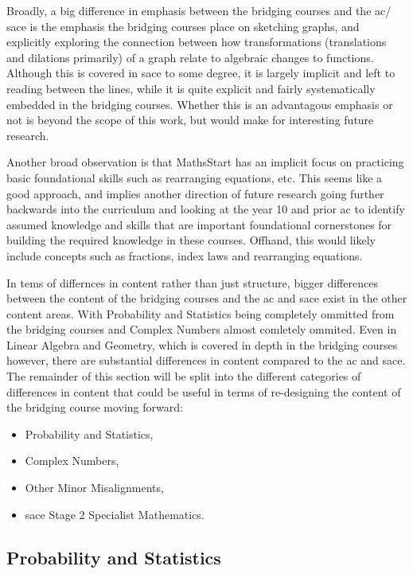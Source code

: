 \documentclass[twoside,12pt,a4paper]{report}
\begin{document}
Broadly, a big difference in emphasis between the bridging courses and the \gls{ac}/ \gls{sace} is the emphasis the bridging courses place on sketching graphs, and explicitly exploring the connection between how transformations (translations and dilations primarily) of a graph relate to algebraic changes to functions. Although this is covered in \gls{sace} to some degree, it is largely implicit and left to reading between the lines, while it is quite explicit and fairly systematically embedded in the bridging courses. Whether this is an advantagous emphasis or not is beyond the scope of this work, but would make for interesting future research.

Another broad observation is that MathsStart has an implicit focus on practicing basic foundational skills such as rearranging equations, etc. This seems like a good approach, and implies another direction of future research going further backwards into the curriculum and looking at the year 10 and prior \gls{ac} to identify assumed knowledge and skills that are important foundational cornerstones for building the required knowledge in these courses. Offhand, this would likely include concepts such as fractions, index laws and rearranging equations. 

In tems of differnces in content rather than just structure, bigger differences between the content of the bridging courses and the \gls{ac} and \gls{sace} exist in the other content areas. With Probability and Statistics being completely ommitted from the bridging courses and Complex Numbers almost comletely ommited. Even in Linear Algebra and Geometry, which is covered in depth in the bridging courses however, there are substantial differences in content compared to the \gls{ac} and \gls{sace}. The remainder of this section will be split into the different categories of differences in content that could be useful in terms of re-designing the content of the bridging course moving forward:
\begin{itemize}
	\item Probability and Statistics,
	\item Complex Numbers,
	\item Other Minor Misalignments,
	\item \gls{sace} Stage 2 Specialist Mathematics. 
\end{itemize}

\subsection{Probability and Statistics}
\end{document}
